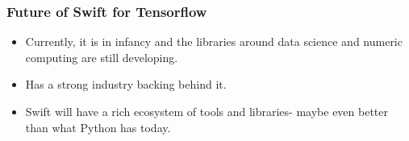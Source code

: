 \begin{frame}[fragile] \frametitle{Future of Swift for Tensorflow}

\begin{itemize}
\item Currently, it is in infancy and the libraries around data science and numeric computing are still developing.
\item Has a strong industry backing behind it.
\item Swift will have a rich ecosystem of tools and libraries- maybe even better than what Python has today.
\end{itemize}

\end{frame}
